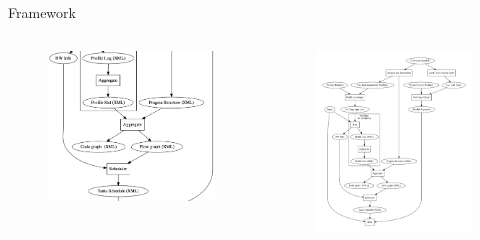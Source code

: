\documentclass[xcolor=dvipsnames]{beamer}
\begin{document}
\begin{section}{Framework}
\begin{frame}{\hskip 0.3cm }
\begin{columns}
\begin{column}{6.5cm}
\begin{figure}
\hskip -1cm
\includegraphics[scale=0.22]{zoom2.png}
\end{figure}

\end{column}
\begin{column}{3.5cm}
\vskip -1.5cm
\begin{figure}
\includegraphics[scale=0.15]{framework.pdf}
\end{figure}


\end{column}
\end{columns}
\end{frame}
\end{section}
\end{document}
